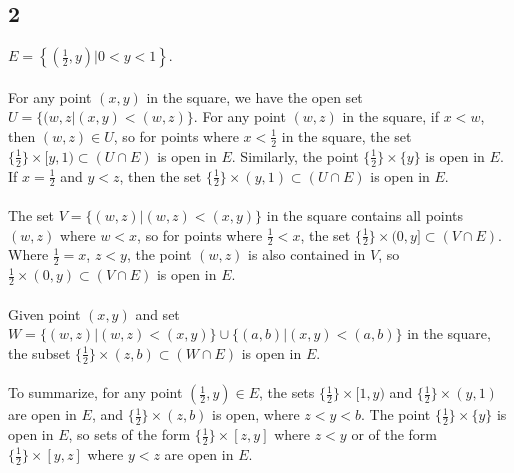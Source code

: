 \documentclass{article}
\begin{document}
\subsection*{2} 
$E = \left\lbrace \left( \frac{1}{2}, y\right) | 0 < y < 1 \right\rbrace$. \\
\\
For any point $(x, y)$ in the square, we have the open set 
 $U = \{ (w, z | (x, y) < (w, z) \}$.  For any point $(w, z)$ in the square, if $x < w$, then 
 $(w, z) \in U$, so for points where $x < \frac{1}{2}$ in the square, the set $\{ \frac{1}{2} \} \times [y, 1) \subset (U \cap E)$ is open in $E$.  
 Similarly, the point $\{\frac{1}{2}\} \times \{y\}$ is open in $E$.  
 If $x = \frac{1}{2}$ and $y < z$, then the set $\{ \frac{1}{2} \} \times (y, 1) \subset (U \cap E)$ is open in $E$. \\ 
 \\ 
The set $V = \{ (w, z) | (w, z) < (x, y) \}$ in the square contains all points $(w, z)$ where $w < x$, so for points where $ \frac{1}{2} < x$, the set 
$\{ \frac{1}{2} \} \times (0, y] \subset (V \cap E)$.  Where $\frac{1}{2} = x$, $z < y$, the point $(w, z)$ is also contained in $V$, 
so $\frac{1}{2} \times (0, y) \subset (V \cap E)$ is open in $E$. \\ 
\\ 
Given point $(x, y)$ and set $W = \{ (w, z) | (w, z) < (x, y) \} \cup \{ (a, b) | (x, y) < (a, b) \}$ in the square, the subset 
$\{ \frac{1}{2} \} \times (z, b) \subset (W \cap E)$ is open in $E$.\\ 
\\ 
To summarize, for any point $(\frac{1}{2}, y) \in E$, the sets $\{ \frac{1}{2} \} \times [1, y)$ and 
$\{ \frac{1}{2} \} \times (y, 1) $ are open in $E$, and $\{ \frac{1}{2} \} \times (z, b)$ is open, where $z < y < b$. 
The point $\{\frac{1}{2}\} \times \{y\}$ is open in $E$, so sets of the form $\{\frac{1}{2}\} \times [z, y]$ 
where $z < y$ or of the form $\{\frac{1}{2}\} \times [y, z]$ where $y < z$ are open in $E$.\\
\end{document}
